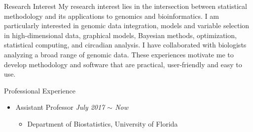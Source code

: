 \documentclass{resume} %
\begin{document}
\begin{rSection}{Research Interest}
My research interest lies in the intersection between statistical methodology and its applications to genomics and bioinformatics.	
I am particularly interested in genomic data integration, models and variable selection in high-dimensional data, graphical models, Bayesian methods, optimization,  statistical computing, and circadian analysis. 
I have collaborated with biologists  analyzing a broad range of genomic data. 
These experiences motivate me to develop methodology and software that are practical, user-friendly and easy to use.
\end{rSection}

\begin{rSection}{Professional Experience}
\begin{itemize}[noitemsep,topsep=0pt]

\item Assistant Professor
        \hfill {\em July 2017 $\sim$ Now} 
        \begin{itemize}
        \item Department of Biostatistics, University of Florida
        \end{itemize}
\end{itemize}
\end{rSection}
\end{document}
